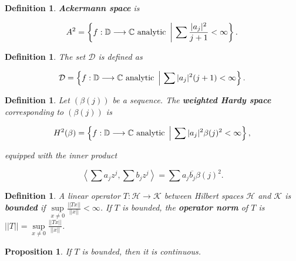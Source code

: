 \documentclass{article}
\theoremstyle{colontheorem}
\newtheorem{proposition}[theorem]{Proposition}
\newtheorem{definition}[theorem]{Definition}
\newenvironment{Proposition}
{
	\begin{mdframed}[backgroundcolor=TheoremOrange!10]
	\begin{proposition}
}
{
	\end{proposition}
	\end{mdframed}
	
	\vspace{.15in}
}
\newenvironment{Def}
{
	\begin{mdframed}[backgroundcolor=DefGreen!10]
	\begin{definition}
}
{
	\end{definition}
	\end{mdframed}
	
	\vspace{.15in}
}
\begin{document}
\begin{Def}
	
	\textbf{Ackermann space} is
	
	$$
		A^2 = \left\{ f : \mathbb{D} \longrightarrow \mathbb{C} \textnormal{ analytic}\ \left|\ \displaystyle\sum \frac{|a_j|^2}{j + 1} < \infty \right\}. \right.
	$$
	
\end{Def}



\begin{Def}
	
	The set $\mathcal{D}$ is defined as
	
	$$
		\mathcal{D} = \left\{ f : \mathbb{D} \longrightarrow \mathbb{C} \textnormal{ analytic}\ \left|\ \displaystyle\sum |a_j|^2 (j + 1) < \infty \right\}. \right.
	$$
	
\end{Def}



\begin{Def}
	
	Let $(\beta(j))$ be a sequence. The \textbf{weighted Hardy space} corresponding to $(\beta(j))$ is
	
	$$
		H^2(\beta) = \left\{ f : \mathbb{D} \longrightarrow \mathbb{C} \textnormal{ analytic}\ \left|\ \displaystyle\sum |a_j|^2 \beta(j)^2 < \infty \right\} \textnormal{,} \right.
	$$
	
	equipped with the inner product
	
	$$
		\left< \sum a_j z^j, \displaystyle\sum b_j z^j \right> = \displaystyle\sum a_j \overline{b_j} \beta(j)^2.
	$$
	
\end{Def}



\begin{Def}
	
	A linear operator $T : \mathcal{H} \longrightarrow \mathcal{K}$ between Hilbert spaces $\mathcal{H}$ and $\mathcal{K}$ is \textbf{bounded} if $\sup\limits_{x \neq 0} \frac{||Tx||}{||x||} < \infty$. If $T$ is bounded, the \textbf{operator norm} of $T$ is $||T|| = \sup\limits_{x \neq 0} \frac{||Tx||}{||x||}$.
	
\end{Def}



\begin{Proposition}
	
	If $T$ is bounded, then it is continuous.
	
\end{Proposition}
\end{document}
